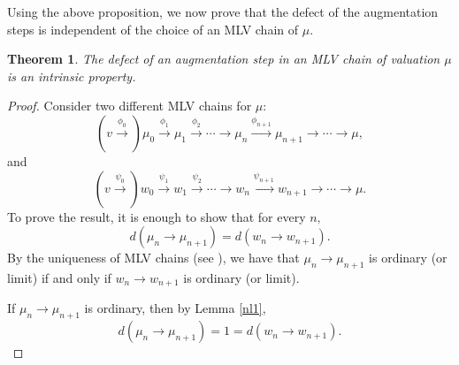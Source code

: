 \documentclass[11pt]{amsart}
\newtheorem{theorem}{Theorem}[section]
\theoremstyle{definition}
\theoremstyle{remark}
\numberwithin{equation}{section}
\begin{document}
  Using the above proposition, we now prove that the defect of the augmentation steps is independent of the choice of an MLV chain of $\mu.$
  \begin{theorem}\label{td1}
  	The defect of an augmentation step in an MLV chain of valuation $\mu$ is an intrinsic property.
  \end{theorem}
  \begin{proof}
  	Consider two different MLV chains for $\mu$: \[(v\xrightarrow{\phi_0})\mu_0\xrightarrow{\phi_1} \mu_1\xrightarrow{\phi_2}\cdots \longrightarrow \mu_{n}\xrightarrow{\phi_{n+1}} \mu_{n+1}\longrightarrow\cdots\longrightarrow \mu,\] and
  	\[(v\xrightarrow{\psi_0})w_0\xrightarrow{\psi_1} w_1\xrightarrow{\psi_2}\cdots \longrightarrow w_{n}\xrightarrow{\psi_{n+1}} w_{n+1}\longrightarrow\cdots\longrightarrow \mu.\]    To prove the result, it is enough to show that for every $n,$ \[d(\mu_n\longrightarrow \mu_{n+1})=d(w_n\longrightarrow w_{n+1}).\] By the uniqueness of MLV chains (see \cite[Theorem 4.7]{EN1}), we have that $\mu_n\longrightarrow \mu_{n+1}$ is ordinary (or limit) if and only if $w_n\longrightarrow w_{n+1}$ is ordinary (or limit). 
  	
  	If $\mu_n\longrightarrow \mu_{n+1}$ is ordinary, then by Lemma \ref{nl1}, \[d(\mu_n\longrightarrow \mu_{n+1})=1=d(w_n\longrightarrow w_{n+1}).\]
  	

\end{proof}
\end{document}
